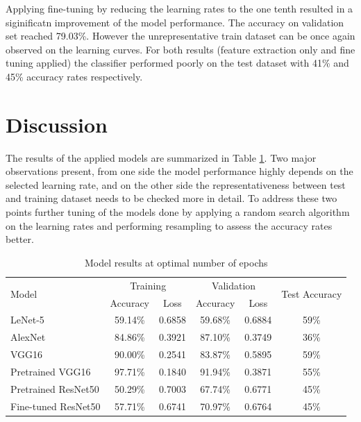 \documentclass[10pt, final]{article}
\begin{document}
Applying fine-tuning by reducing the learning rates to the one tenth resulted in a siginificatn improvement
of the model performance.
The accuracy on validation set reached 79.03\%.
However the unrepresentative train dataset can be once again observed on the learning curves.
For both results (feature extraction only and fine tuning applied) the classifier performed poorly on the test
dataset with 41\% and 45\% accuracy rates respectively.

\section{Discussion} \label{sec:discussion}
The results of the applied models are summarized in Table \ref{table:results_summary}.
Two major observations present, from one side the model performance highly depends on the selected learning rate,
and on the other side the representativeness between test and training dataset needs to be checked more in detail.
To address these two points further tuning of the models done by applying a random search algorithm on the learning rates
and performing resampling to assess the accuracy rates better.

\begin{table}[!ht]
	\centering
	\begin{tabular}{l c c c c c}
		\multirow{2}{*}{Model} & \multicolumn{2}{c}{Training} & \multicolumn{2}{c}{Validation} & \multirow{2}{*}{Test Accuracy}                 \\
		                       & Accuracy                     & Loss                           & Accuracy                       & Loss   &      \\
		\hline
		LeNet-5                & 59.14\%                      & 0.6858                         & 59.68\%                        & 0.6884 & 59\% \\
		AlexNet                & 84.86\%                      & 0.3921                         & 87.10\%                        & 0.3749 & 36\% \\
		VGG16                  & 90.00\%                      & 0.2541                         & 83.87\%                        & 0.5895 & 59\% \\
		Pretrained VGG16       & 97.71\%                      & 0.1840                         & 91.94\%                        & 0.3871 & 55\% \\
		Pretrained ResNet50    & 50.29\%                      & 0.7003                         & 67.74\%                        & 0.6771 & 45\% \\
		Fine-tuned ResNet50    & 57.71\%                      & 0.6741                         & 70.97\%                        & 0.6764 & 45\% \\
		\hline
	\end{tabular}
	\caption{Model results at optimal number of epochs}
	\label{table:results_summary}
\end{table}
\end{document}
